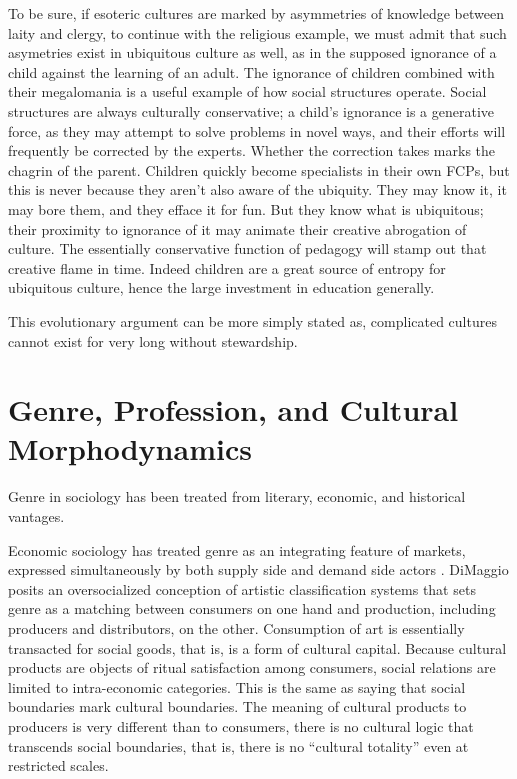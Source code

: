 \documentclass[]{book}
\theoremstyle{definition}
\theoremstyle{definition}
\theoremstyle{definition}
\theoremstyle{remark}
\begin{document}
To be sure, if esoteric cultures are marked by asymmetries of knowledge
between laity and clergy, to continue with the religious example, we
must admit that such asymetries exist in ubiquitous culture as well, as
in the supposed ignorance of a child against the learning of an adult.
The ignorance of children combined with their megalomania is a useful
example of how social structures operate. Social structures are always
culturally conservative; a child's ignorance is a generative force, as
they may attempt to solve problems in novel ways, and their efforts will
frequently be corrected by the experts. Whether the correction takes
marks the chagrin of the parent. Children quickly become specialists in
their own FCPs, but this is never because they aren't also aware of the
ubiquity. They may know it, it may bore them, and they efface it for
fun. But they know what is ubiquitous; their proximity to ignorance of
it may animate their creative abrogation of culture. The essentially
conservative function of pedagogy will stamp out that creative flame in
time. Indeed children are a great source of entropy for ubiquitous
culture, hence the large investment in education generally.

This evolutionary argument can be more simply stated as, complicated
cultures cannot exist for very long without stewardship.

\hypertarget{genre-profession-and-cultural-morphodynamics}{%
\section{Genre, Profession, and Cultural
Morphodynamics}\label{genre-profession-and-cultural-morphodynamics}}

Genre in sociology has been treated from literary, economic, and
historical vantages.

Economic sociology has treated genre as an integrating feature of
markets, expressed simultaneously by both supply side and demand side
actors \citep[441]{DiMaggio1987Classification}. DiMaggio posits an
oversocialized conception of artistic classification systems that sets
genre as a matching between consumers on one hand and production,
including producers and distributors, on the other. Consumption of art
is essentially transacted for social goods, that is, is a form of
cultural capital. Because cultural products are objects of ritual
satisfaction among consumers, social relations are limited to
intra-economic categories. This is the same as saying that social
boundaries mark cultural boundaries. The meaning of cultural products to
producers is very different than to consumers, there is no cultural
logic that transcends social boundaries, that is, there is no ``cultural
totality'' even at restricted scales.
\end{document}
